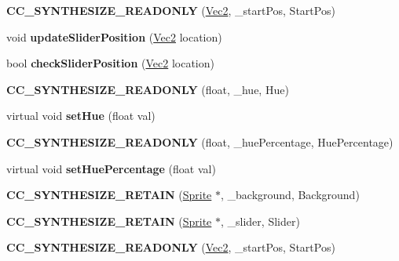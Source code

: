\begin{DoxyCompactItemize}
\mbox{\label{classControlHuePicker_a53409d52064e6cc5de2fe7460b007486}} 
{\bfseries C\+C\+\_\+\+S\+Y\+N\+T\+H\+E\+S\+I\+Z\+E\+\_\+\+R\+E\+A\+D\+O\+N\+LY} (\hyperlink{classVec2}{Vec2}, \+\_\+start\+Pos, Start\+Pos)
\item 
\mbox{\label{classControlHuePicker_a9789fd6af1788cf5e2be590c1e18ce94}} 
void {\bfseries update\+Slider\+Position} (\hyperlink{classVec2}{Vec2} location)
\item 
\mbox{\label{classControlHuePicker_ad108be7e759b9d14ff54da6d787ee178}} 
bool {\bfseries check\+Slider\+Position} (\hyperlink{classVec2}{Vec2} location)
\item 
\mbox{\label{classControlHuePicker_aa6f70bb12c206d660b035ab5025d6f73}} 
{\bfseries C\+C\+\_\+\+S\+Y\+N\+T\+H\+E\+S\+I\+Z\+E\+\_\+\+R\+E\+A\+D\+O\+N\+LY} (float, \+\_\+hue, Hue)
\item 
\mbox{\label{classControlHuePicker_ac6d95ae559034307c8c05ff1540db86b}} 
virtual void {\bfseries set\+Hue} (float val)
\item 
\mbox{\label{classControlHuePicker_af2569db7be1371cc3da32deab2907153}} 
{\bfseries C\+C\+\_\+\+S\+Y\+N\+T\+H\+E\+S\+I\+Z\+E\+\_\+\+R\+E\+A\+D\+O\+N\+LY} (float, \+\_\+hue\+Percentage, Hue\+Percentage)
\item 
\mbox{\label{classControlHuePicker_ac0e3cdb6a46defdac1efe9d9b26bf005}} 
virtual void {\bfseries set\+Hue\+Percentage} (float val)
\item 
\mbox{\label{classControlHuePicker_adf2a746a2479b13396d6a83e31e21a3f}} 
{\bfseries C\+C\+\_\+\+S\+Y\+N\+T\+H\+E\+S\+I\+Z\+E\+\_\+\+R\+E\+T\+A\+IN} (\hyperlink{classSprite}{Sprite} $\ast$, \+\_\+background, Background)
\item 
\mbox{\label{classControlHuePicker_a1d13f80c98e3f8eefe104ce07197b3d3}} 
{\bfseries C\+C\+\_\+\+S\+Y\+N\+T\+H\+E\+S\+I\+Z\+E\+\_\+\+R\+E\+T\+A\+IN} (\hyperlink{classSprite}{Sprite} $\ast$, \+\_\+slider, Slider)
\item 
\mbox{\label{classControlHuePicker_a53409d52064e6cc5de2fe7460b007486}} 
{\bfseries C\+C\+\_\+\+S\+Y\+N\+T\+H\+E\+S\+I\+Z\+E\+\_\+\+R\+E\+A\+D\+O\+N\+LY} (\hyperlink{classVec2}{Vec2}, \+\_\+start\+Pos, Start\+Pos)
\end{DoxyCompactItemize}
